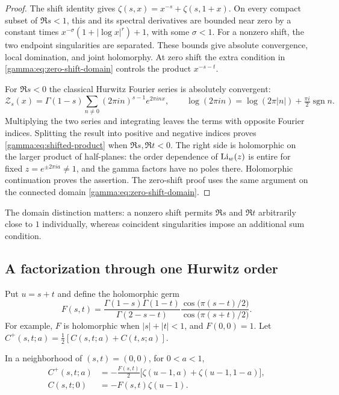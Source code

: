 \begin{proof}
The shift identity gives
$\zeta(s,x)=x^{-s}+\zeta(s,1+x)$.
On every compact subset of $\Re s<1$, this and its spectral derivatives
are bounded near zero by a constant times
$x^{-\sigma}(1+|\log x|^r)+1$, with some $\sigma<1$.
For a nonzero shift, the two endpoint singularities are separated.
These bounds give absolute convergence, local domination, and joint
holomorphy. At zero shift the extra condition in
\eqref{gamma:eq:zero-shift-domain} controls the product $x^{-s-t}$.

For $\Re s<0$ the classical Hurwitz Fourier series is absolutely
convergent:
\begin{equation}
 \mathcal Z_s(x)=\Gamma(1-s)
       \sum_{n\ne0}(2\pi in)^{s-1}e^{2\pi inx},
 \qquad \log(2\pi in)=\log(2\pi|n|)+\tfrac{\pi i}{2}\operatorname{sgn}n.
 \label{gamma:eq:hurwitz-fourier}
\end{equation}
Multiplying the two series and integrating leaves the terms with
opposite Fourier indices. Splitting the result into positive and
negative indices proves \eqref{gamma:eq:shifted-product} when
$\Re s,\Re t<0$. The right side is holomorphic on the larger product
of half-planes: the order dependence of $\operatorname{Li}_w(z)$ is entire for fixed
$z=e^{\pm2\pi ia}\ne1$, and the gamma factors have no poles there.
Holomorphic continuation proves the assertion. The zero-shift proof
uses the same argument on the connected domain
\eqref{gamma:eq:zero-shift-domain}.
\end{proof}

The domain distinction matters: a nonzero shift permits $\Re s$ and
$\Re t$ arbitrarily close to $1$ individually, whereas coincident
singularities impose an additional sum condition.

\subsection{A factorization through one Hurwitz order}

Put $u=s+t$ and define the holomorphic germ
\begin{equation}
 F(s,t)=\frac{\Gamma(1-s)\Gamma(1-t)}{\Gamma(2-s-t)}
 \frac{\cos\bigl(\pi(s-t)/2\bigr)}{\cos\bigl(\pi(s+t)/2\bigr)}.
 \label{gamma:eq:F}
\end{equation}
For example, $F$ is holomorphic when $|s|+|t|<1$, and $F(0,0)=1$.
Let
$C^+(s,t;a)=\tfrac12[C(s,t;a)+C(t,s;a)]$.

\begin{proposition}
\label{gamma:prop:factorization}
In a neighborhood of $(s,t)=(0,0)$, for $0<a<1$,
\begin{align}
 C^+(s,t;a)
 &=-\frac{F(s,t)}2\bigl[\zeta(u-1,a)+\zeta(u-1,1-a)\bigr],
 \label{gamma:eq:factorization}\\
 C(s,t;0)&=-F(s,t)\zeta(u-1).
 \label{gamma:eq:factorization-zero}
\end{align}
\end{proposition}

